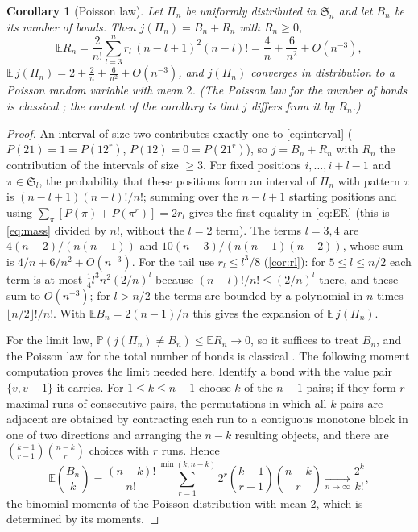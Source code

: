 \documentclass[11pt,reqno]{amsart}
\theoremstyle{plain}
\newtheorem{corollary}[corollary]{Corollary}
\theoremstyle{definition}
\theoremstyle{remark}
\newcommand{\Sym}{\mathfrak{S}}
\newcommand{\PP}{\mathbb{P}}
\newcommand{\EE}{\mathbb{E}}
\begin{document}
\begin{corollary}[Poisson law]\label{cor:poisson}
Let $\Pi_n$ be uniformly distributed in $\Sym_n$ and let $B_n$ be its number of bonds. Then $j(\Pi_n)=B_n+R_n$ with $R_n\ge0$,
\begin{equation}\label{eq:ER}
\EE R_n=\frac{2}{n!}\sum_{l=3}^{n}r_l\,(n-l+1)^2(n-l)!=\frac4n+\frac6{n^2}+O(n^{-3}),
\end{equation}
$\EE\,j(\Pi_n)=2+\frac2n+\frac6{n^2}+O(n^{-3})$, and $j(\Pi_n)$ converges in distribution to a Poisson random variable with mean $2$. (The Poisson law for the number of bonds is classical \cite{Wolfowitz1944,Kaplansky1945}; the content of the corollary is that $j$ differs from it by $R_n$.)
\end{corollary}

\begin{proof}
An interval of size two contributes exactly one to \eqref{eq:interval} ($P(21)=1=P(12^r)$, $P(12)=0=P(21^r)$), so $j=B_n+R_n$ with $R_n$ the contribution of the intervals of size $\ge3$. For fixed positions $i,\dots,i+l-1$ and $\pi\in\Sym_l$, the probability that these positions form an interval of $\Pi_n$ with pattern $\pi$ is $(n-l+1)(n-l)!/n!$; summing over the $n-l+1$ starting positions and using $\sum_{\pi}[P(\pi)+P(\pi^r)]=2r_l$ gives the first equality in \eqref{eq:ER} (this is \eqref{eq:mass} divided by $n!$, without the $l=2$ term). The terms $l=3,4$ are $4(n-2)/(n(n-1))$ and $10(n-3)/(n(n-1)(n-2))$, whose sum is $4/n+6/n^2+O(n^{-3})$. For the tail use $r_l\le l^3/8$ (\cref{cor:rl}): for $5\le l\le n/2$ each term is at most $\tfrac14l^3n^2(2/n)^l$ because $(n-l)!/n!\le(2/n)^l$ there, and these sum to $O(n^{-3})$; for $l>n/2$ the terms are bounded by a polynomial in $n$ times $\lfloor n/2\rfloor!/n!$. With $\EE B_n=2(n-1)/n$ this gives the expansion of $\EE\,j(\Pi_n)$.

For the limit law, $\PP(j(\Pi_n)\ne B_n)\le\EE R_n\to0$, so it suffices to treat $B_n$, and the Poisson law for the total number of bonds is classical
\cite{Wolfowitz1944,Kaplansky1945}. The following moment computation
proves the limit needed here. Identify a bond with the value pair $\{v,v+1\}$ it carries. For $1\le k\le n-1$ choose $k$ of the $n-1$ pairs; if they form $r$ maximal runs of consecutive pairs, the permutations in which all $k$ pairs are adjacent are obtained by contracting each run to a contiguous monotone block in one of two directions and arranging the $n-k$ resulting objects, and there are $\binom{k-1}{r-1}\binom{n-k}r$ choices with $r$ runs. Hence
\[
\EE\binom{B_n}{k}=\frac{(n-k)!}{n!}\sum_{r=1}^{\min(k,n-k)}2^r\binom{k-1}{r-1}\binom{n-k}{r}\xrightarrow[n\to\infty]{}\frac{2^k}{k!},
\]
the binomial moments of the Poisson distribution with mean $2$, which is determined by its moments.
\end{proof}
\end{document}
